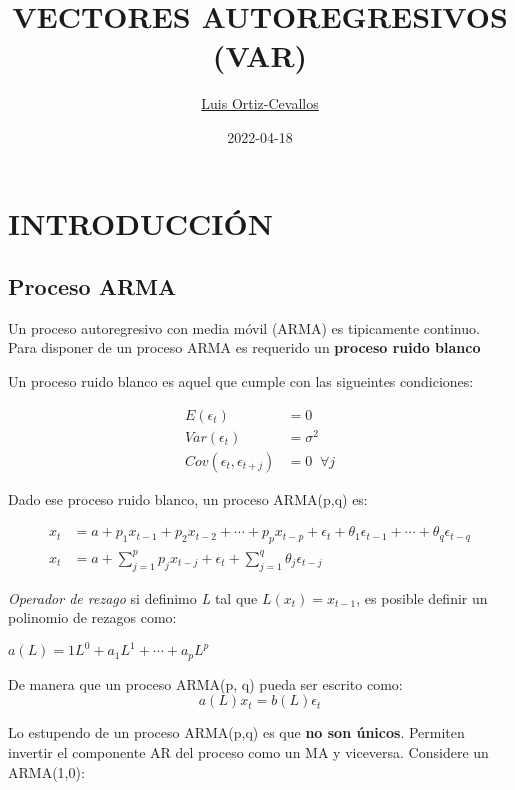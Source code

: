 \documentclass[
]{book}
\title{VECTORES AUTOREGRESIVOS (VAR)}
\author{\href{https://ortiz-cevallos.github.io/MYSELF/}{Luis Ortiz-Cevallos}}
\date{2022-04-18}
\begin{document}
\maketitle

{
\setcounter{tocdepth}{1}
\tableofcontents
}
\hypertarget{introducciuxf3n}{%
\chapter{INTRODUCCIÓN}\label{introducciuxf3n}}

\hypertarget{proceso-arma}{%
\section{Proceso ARMA}\label{proceso-arma}}

Un proceso autoregresivo con media móvil (ARMA) es tipicamente continuo. Para disponer de un proceso ARMA es requerido un \textbf{proceso ruido blanco}

Un proceso ruido blanco es aquel que cumple con las sigueintes condiciones:

\begin{align}
E(\epsilon_{t})&=0\\
Var(\epsilon_{t})&=\sigma^{2}\\
Cov(\epsilon_{t}, \epsilon_{t+j})&=0\;\; \forall j
\end{align}

Dado ese proceso ruido blanco, un proceso ARMA(p,q) es:

\begin{align}
x_{t}&= a+p_{1}x_{t-1}+p_{2}x_{t-2}+\cdots+p_{p}x_{t-p}+\epsilon_{t}+\theta_{1}\epsilon_{t-1}+\cdots+\theta_{q}\epsilon_{t-q}\\
x_{t}&= a+\sum_{j=1}^{p}p_{j}x_{t-j}+\epsilon_{t}+\sum_{j=1}^{q}\theta_{j}\epsilon_{t-j}
\end{align}

\emph{Operador de rezago} si definimo \emph{L} tal que \(L(x_{t})=x_{t-1}\), es posible definir un polinomio de rezagos como:

\(a(L)=1L^{0}+a_{1}L^{1}+\cdots+a_{p}L^{p}\)

De manera que un proceso ARMA(p, q) pueda ser escrito como:
\begin{equation}
a(L)x_{t}=b(L)\epsilon_{t}
\end{equation}

Lo estupendo de un proceso ARMA(p,q) es que \textbf{no son únicos}. Permiten invertir el componente AR del proceso como un MA y viceversa. Considere un ARMA(1,0):
\end{document}
